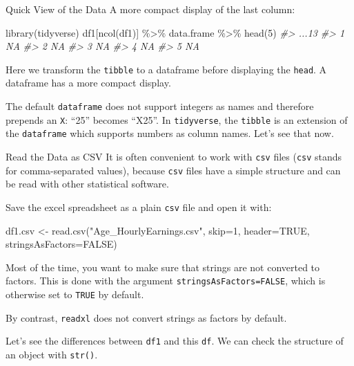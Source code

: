 \documentclass[
  11pt,
  ignorenonframetext,
  svgnames, handout, t]{beamer}
\newenvironment{Shaded}{\begin{snugshade}}{\end{snugshade}}
\newcommand{\AttributeTok}[1]{\textcolor[rgb]{0.77,0.63,0.00}{#1}}
\newcommand{\CommentTok}[1]{\textcolor[rgb]{0.56,0.35,0.01}{\textit{#1}}}
\newcommand{\ConstantTok}[1]{\textcolor[rgb]{0.00,0.00,0.00}{#1}}
\newcommand{\DecValTok}[1]{\textcolor[rgb]{0.00,0.00,0.81}{#1}}
\newcommand{\FunctionTok}[1]{\textcolor[rgb]{0.00,0.00,0.00}{#1}}
\newcommand{\NormalTok}[1]{#1}
\newcommand{\OtherTok}[1]{\textcolor[rgb]{0.56,0.35,0.01}{#1}}
\newcommand{\SpecialCharTok}[1]{\textcolor[rgb]{0.00,0.00,0.00}{#1}}
\newcommand{\StringTok}[1]{\textcolor[rgb]{0.31,0.60,0.02}{#1}}
\begin{document}
\begin{frame}[fragile]{Quick View of the Data}
\protect\hypertarget{quick-view-of-the-data-7}{}
A more compact display of the last column:

\footnotesize

\begin{Shaded}
\begin{Highlighting}[]
\FunctionTok{library}\NormalTok{(tidyverse)}
\NormalTok{df1[}\FunctionTok{ncol}\NormalTok{(df1)] }\SpecialCharTok{\%\textgreater{}\%}\NormalTok{ data.frame }\SpecialCharTok{\%\textgreater{}\%} \FunctionTok{head}\NormalTok{(}\DecValTok{5}\NormalTok{)}
\CommentTok{\#\textgreater{}   ...13}
\CommentTok{\#\textgreater{} 1    NA}
\CommentTok{\#\textgreater{} 2    NA}
\CommentTok{\#\textgreater{} 3    NA}
\CommentTok{\#\textgreater{} 4    NA}
\CommentTok{\#\textgreater{} 5    NA}
\end{Highlighting}
\end{Shaded}

\normalsize Here we transform the \texttt{tibble} to a dataframe before
displaying the \texttt{head}. A dataframe has a more compact display.

The default \texttt{dataframe} does not support integers as names and
therefore prepends an \texttt{X}: ``25'' becomes ``X25''. In
\texttt{tidyverse}, the \texttt{tibble} is an extension of the
\texttt{dataframe} which supports numbers as column names. Let's see
that now.
\end{frame}

\begin{frame}[fragile]{Read the Data as CSV}
\protect\hypertarget{read-the-data-as-csv}{}
It is often convenient to work with \texttt{csv} files (\texttt{csv}
stands for comma-separated values), because \texttt{csv} files have a
simple structure and can be read with other statistical software.

Save the excel spreadsheet as a plain \texttt{csv} file and open it
with:

\footnotesize

\begin{Shaded}
\begin{Highlighting}[]
\NormalTok{df1.csv }\OtherTok{\textless{}{-}} \FunctionTok{read.csv}\NormalTok{(}\StringTok{"Age\_HourlyEarnings.csv"}\NormalTok{, }
                    \AttributeTok{skip=}\DecValTok{1}\NormalTok{, }
                    \AttributeTok{header=}\ConstantTok{TRUE}\NormalTok{, }
                    \AttributeTok{stringsAsFactors=}\ConstantTok{FALSE}\NormalTok{)}
\end{Highlighting}
\end{Shaded}

\normalsize

Most of the time, you want to make sure that strings are not converted
to factors. This is done with the argument
\texttt{stringsAsFactors=FALSE}, which is otherwise set to \texttt{TRUE}
by default.

By contrast, \texttt{readxl} does not convert strings as factors by
default.

Let's see the differences between \texttt{df1} and this \texttt{df}. We
can check the structure of an object with \texttt{str()}.
\end{frame}
\end{document}
